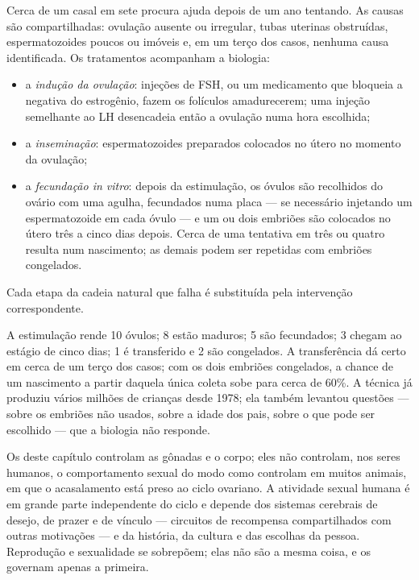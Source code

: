 \begin{proposition}\label{prop:g11:hormones-and-reproduction:art}
Cerca de um casal em sete procura ajuda depois de um ano tentando. As
causas são compartilhadas: ovulação ausente ou irregular, tubas
uterinas obstruídas, espermatozoides poucos ou imóveis e, em um terço
dos casos, nenhuma causa identificada. Os tratamentos acompanham a
biologia:
\begin{itemize}
  \item a \emph{indução da ovulação}: injeções de FSH, ou um
        medicamento que bloqueia a  negativa do
        estrogênio, fazem os folículos amadurecerem; uma injeção
        semelhante ao LH desencadeia então a ovulação numa hora
        escolhida;
  \item a \emph{inseminação}: espermatozoides preparados colocados no
        útero no momento da ovulação;
  \item a \emph{fecundação in vitro}: depois da estimulação, os óvulos
        são recolhidos do ovário com uma agulha, fecundados numa placa
        --- se necessário injetando um espermatozoide em cada óvulo ---
        e um ou dois embriões são colocados no útero três a cinco dias
        depois. Cerca de uma tentativa em três ou quatro resulta num
        nascimento; as demais podem ser repetidas com embriões
        congelados.
\end{itemize}
Cada etapa da cadeia natural que falha é substituída pela intervenção
correspondente.
\end{proposition}
\admitted

\begin{example}\label{ex:g11:hormones-and-reproduction:ivf}
A estimulação rende 10 óvulos; 8 estão maduros; 5 são fecundados; 3
chegam ao estágio de cinco dias; 1 é transferido e 2 são congelados. A
transferência dá certo em cerca de um terço dos casos; com os dois
embriões congelados, a chance de um nascimento a partir daquela única
coleta sobe para cerca de 60\%. A técnica já produziu vários milhões de
crianças desde 1978; ela também levantou questões --- sobre os embriões
não usados, sobre a idade dos pais, sobre o que pode ser escolhido ---
que a biologia não responde.
\end{example}

\begin{remark}\label{rem:g11:hormones-and-reproduction:brain}
Os  deste capítulo controlam as gônadas e o corpo; eles não
controlam, nos seres humanos, o comportamento sexual do modo como
controlam em muitos animais, em que o acasalamento está preso ao ciclo
ovariano. A atividade sexual humana é em grande parte independente do
ciclo e depende dos sistemas cerebrais de desejo, de prazer e de
vínculo --- circuitos de recompensa compartilhados com outras
motivações --- e da história, da cultura e das escolhas da pessoa.
Reprodução e sexualidade se sobrepõem; elas não são a mesma coisa, e os
 governam apenas a primeira.
\end{remark}

